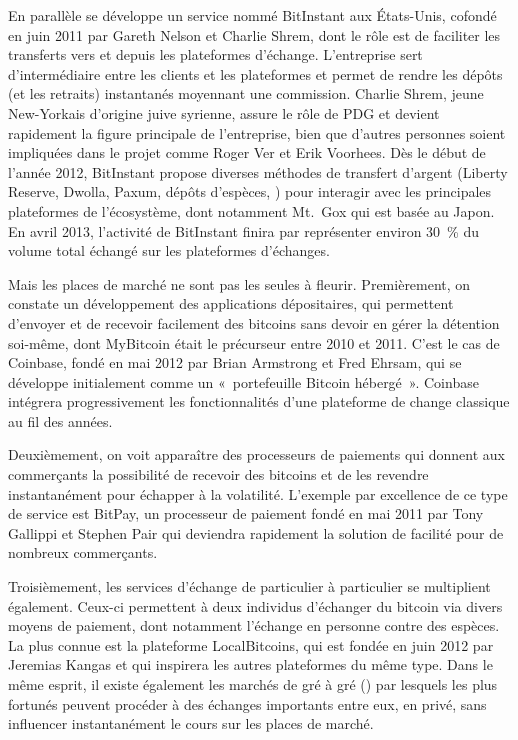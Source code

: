 En parallèle se développe un service nommé BitInstant aux États-Unis, cofondé en juin 2011 par Gareth Nelson et Charlie Shrem, dont le rôle est de faciliter les transferts vers et depuis les plateformes d'échange. L'entreprise sert d'intermédiaire entre les clients et les plateformes et permet de rendre les dépôts (et les retraits) instantanés moyennant une commission. Charlie Shrem, jeune New-Yorkais d'origine juive syrienne, assure le rôle de PDG et devient rapidement la figure principale de l'entreprise, bien que d'autres personnes soient impliquées dans le projet comme Roger Ver et Erik Voorhees. Dès le début de l'année 2012, BitInstant propose diverses méthodes de transfert d'argent (Liberty Reserve, Dwolla, Paxum, dépôts d'espèces, ) pour interagir avec les principales plateformes de l'écosystème, dont notamment Mt.~Gox qui est basée au Japon. En avril 2013, l'activité de BitInstant finira par représenter environ 30~\% du volume total échangé sur les plateformes d'échanges.

Mais les places de marché ne sont pas les seules à fleurir. Premièrement, on constate un développement des applications dépositaires, qui permettent d'envoyer et de recevoir facilement des bitcoins sans devoir en gérer la détention soi-même, dont MyBitcoin était le précurseur entre 2010 et 2011. C'est le cas de Coinbase, fondé en mai 2012 par Brian Armstrong et Fred Ehrsam, qui se développe initialement comme un «~portefeuille Bitcoin hébergé~». Coinbase intégrera progressivement les fonctionnalités d'une plateforme de change classique au fil des années.

Deuxièmement, on voit apparaître des processeurs de paiements qui donnent aux commerçants la possibilité de recevoir des bitcoins et de les revendre instantanément pour échapper à la volatilité. L'exemple par excellence de ce type de service est BitPay, un processeur de paiement fondé en mai 2011 par Tony Gallippi et Stephen Pair qui deviendra rapidement la solution de facilité pour de nombreux commerçants.

Troisièmement, les services d'échange de particulier à particulier se multiplient également. Ceux-ci permettent à deux individus d'échanger du bitcoin via divers moyens de paiement, dont notamment l'échange en personne contre des espèces. La plus connue est la plateforme LocalBitcoins, qui est fondée en juin 2012 par Jeremias Kangas et qui inspirera les autres plateformes du même type. Dans le même esprit, il existe également les marchés de gré à gré () par lesquels les plus fortunés peuvent procéder à des échanges importants entre eux, en privé, sans influencer instantanément le cours sur les places de marché.


